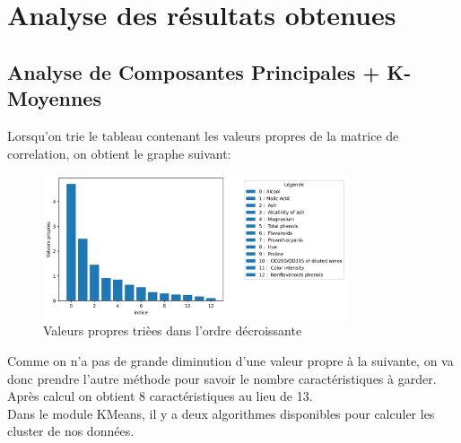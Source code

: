 \documentclass[a4paper,12pt]{article}
\begin{document}
\newpage

\section{Analyse des résultats obtenues}
\label{sec:analyse}

\subsection{Analyse de Composantes Principales + K-Moyennes}

Lorsqu'on trie le tableau contenant les valeurs propres de la matrice de correlation, on obtient le graphe suivant: \\

\begin{figure}[h!] %
   \centering
   \includegraphics[width=0.8\textwidth]{vp.png} %
   \caption{Valeurs propres trièes dans l'ordre décroissante}
   \label{fig:vp} %
\end{figure}  
             
Comme on n'a pas de grande diminution d'une valeur propre à la suivante, on va donc prendre l'autre méthode pour savoir le nombre caractéristiques à garder. Après calcul on obtient 8 caractéristiques au lieu de 13.\\

Dans le module KMeans, il y a deux algorithmes disponibles pour calculer les cluster de nos données.
\end{document}
